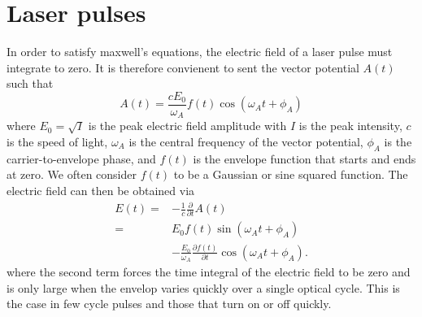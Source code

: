\section{Laser pulses} %
\label{sec:laser_pulses}
In order to satisfy maxwell's equations, the electric field of a laser pulse must integrate to zero. It is therefore convienent to sent the vector potential $A(t)$ such that 
\begin{equation}
    A(t) = \frac{c E_0}{\omega_A}f(t) \cos(\omega_A t +\phi_A)
\end{equation}
where $E_0=\sqrt{I}$ is the peak electric field amplitude with $I$ is the peak intensity, $c$ is the speed of light, $\omega_A$ is the central frequency of the vector potential, $\phi_A$ is the carrier-to-envelope phase, and $f(t)$ is the envelope function that starts and ends at zero. We often consider $f(t)$ to be a Gaussian or sine squared function. The electric field can then be obtained via
\begin{equation}
\begin{split}
\label{eq:efield}
E(t) =& -\frac{1}{c}\frac{\partial}{\partial t}A(t)
\\
=&E_0f(t) \sin(\omega_A t +\phi_A)
\\
&
-\frac{E_0}{\omega_A}\frac{\partial f(t)}{\partial t}
\cos(\omega_A t +\phi_A).
\end{split}
\end{equation}
where the second term forces the time integral of the electric field to be zero and is only large when the envelop varies quickly over a single optical cycle. This is the case in few cycle pulses and those that turn on or off quickly.

